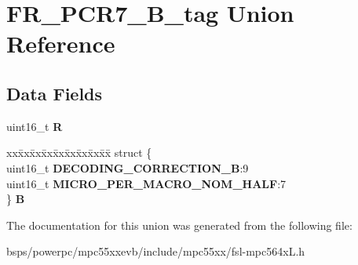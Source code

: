 \hypertarget{unionFR__PCR7__16B__tag}{}\section{F\+R\+\_\+\+P\+C\+R7\+\_\+B\+\_\+tag Union Reference}
\label{unionFR__PCR7__16B__tag}
\subsection*{Data Fields}
\begin{DoxyCompactItemize}
\item 
\mbox{\label{unionFR__PCR7__16B__tag_a65cb0aae3bb8ee456da36e7370f4cd6a}} 
uint16\+\_\+t {\bfseries R}
\item 
\mbox{\label{unionFR__PCR7__16B__tag_aa06f7f900fc314ab8a7ffb57137de131}} 
\begin{tabbing}
xx\=xx\=xx\=xx\=xx\=xx\=xx\=xx\=xx\=\kill
struct \{\\
\>uint16\_t {\bfseries DECODING\_CORRECTION\_B}:9\\
\>uint16\_t {\bfseries MICRO\_PER\_MACRO\_NOM\_HALF}:7\\
\} {\bfseries B}\\

\end{tabbing}\end{DoxyCompactItemize}


The documentation for this union was generated from the following file\+:\begin{DoxyCompactItemize}
\item 
bsps/powerpc/mpc55xxevb/include/mpc55xx/fsl-\/mpc564x\+L.\+h\end{DoxyCompactItemize}
